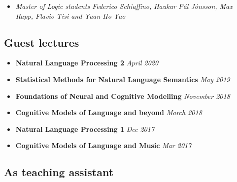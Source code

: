 {{{{{{{{{
{\begin{itemize}
  \item[] \textit{Master of Logic students Federico Schiaffino, Haukur Pál Jónsson, Max Rapp, Flavio Tisi and Yuan-Ho Yao}
\end{itemize}}}

\subsection{Guest lectures}

\begin{itemize}
\setlength\itemsep{3pt}
    \item \textbf{Natural Language Processing 2} \hfill \textit{April 2020}
    \item \textbf{Statistical Methods for Natural Language Semantics} \hfill \textit{May 2019}
    \item \textbf{Foundations of Neural and Cognitive Modelling} \hfill \textit{November 2018}
    \item \textbf{Cognitive Models of Language and beyond} \hfill \textit{March 2018}
    \item \textbf{Natural Language Processing 1} \hfill \textit{Dec 2017}
    \item \textbf{Cognitive Models of Language and Music} \hfill \textit{Mar 2017}
\end{itemize}

\vspace{2mm}

\begin{comment}
{\customcvproject{Semantics}{May 2019}
{%
}}
{\customcvproject{Foundations of Neural and Cognitive Modelling}{November 2018}{}}
{\customcvproject{Natural Language Processing 1}{Dec 2017}{}}
{\customcvproject{Cognitive Models of Language and Music}{Mar 2017}{}}
\end{comment}

\subsection{As teaching assistant}

}}}}}}}}
